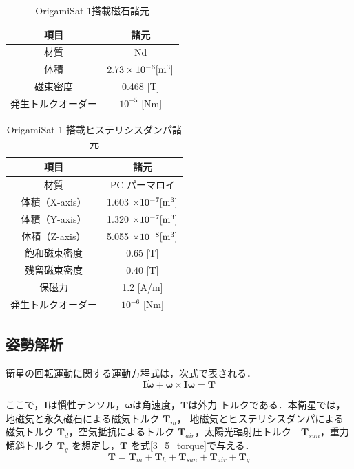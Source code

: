 \begin{table}[htb]
    \centering
    \caption{OrigamiSat-1搭載磁石諸元}
    \label{spec_magnet}
    \begin{tabular}{cc} \hline
      項目 & 諸元 \\ \hline\hline
      材質 & Nd \\
        体積 & $2.73 \times 10^{-6} [\rm{m^3}]$\\ 
        磁束密度 & 0.468 [T] \\ 
        発生トルクオーダー & $10^{-5}$ [Nm] \\ \hline   
    \end{tabular}
    \label{requirment_op}
\end{table}

\begin{table}[htb]
    \centering
    \caption{OrigamiSat-1 搭載ヒステリシスダンパ諸元}
    \label{spec_HD}
    \begin{tabular}{cc} \hline
      項目 & 諸元 \\ \hline\hline
        材質 & PC パーマロイ \\
        体積（X-axis） & 1.603 $\times 10^{-7} [\rm{m^3}]$ \\
        体積（Y-axis） & 1.320 $\times 10^{-7} [\rm{m^3}]$ \\
        体積（Z-axis） & 5.055 $\times 10^{-8} [\rm{m^3}]$ \\
        飽和磁束密度　& 0.65 [T] \\
        残留磁束密度 & 0.40 [T] \\
        保磁力 & 1.2 [A/m] \\
        発生トルクオーダー & $10^{-6}$ [Nm] \\ \hline    
    \end{tabular}
    \label{requirment_op}
\end{table}

\subsection{姿勢解析}
衛星の回転運動に関する運動方程式は，次式で表される．
\begin{equation}
  \bm{I} \dot{\bm{\omega}} + \bm{\omega} \times \bm{I} \bm{\omega} = \bm{T}
\end{equation}

ここで，$\bm{I}$は慣性テンソル，$\bm{\omega}$は角速度，$\bm{T}$は外力
トルクである．本衛星では，地磁気と永久磁石による磁気トルク $\bm{T}_{m}$，
地磁気とヒステリシスダンパによる磁気トルク $\bm{T}_{d}$，空気抵抗によるトルク
$\bm{T}_{air}$，太陽光輻射圧トルク　$\bm{T}_{sun}$，重力傾斜トルク
$\bm{T}_{g}$ を想定し，$\bm{T}$ を式\ref{3_5_torque}で与える．
\begin{equation}
  \bm{T} = \bm{T}_{m} + \bm{T}_h + \bm{T}_{sun} + \bm{T}_{air} + \bm{T}_{g} \label{3_5_torque}
\end{equation}


